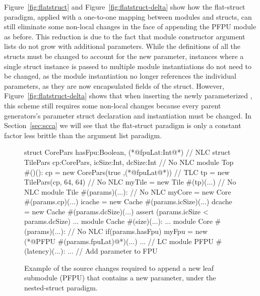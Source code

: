Figure~\ref{fig:flatstruct} and Figure~\ref{fig:flatstruct-delta} show how the flat-struct paradigm,
applied with a one-to-one mapping between modules and structs,
can still eliminate some non-local changes in the face of appending the PFPU module as before.
This reduction is due to the fact that module constructor argument lists do not grow with additional parameters.
While the definitions of all the structs must be changed to account for the new parameter,
instances where a single struct instance is passed to multiple module instantiations do not need to be changed,
as the module instantiation no longer references the individual parameters, as they are now encapsulated fields of the struct.
However, Figure~\ref{fig:flatstruct-delta} shows that when inserting the newly parameterized ,
this scheme still requires some non-local changes because every parent generators's parameter struct declaration and instantiation must be changed.
In Section~\ref{sec:scca} we will see that the flat-struct paradigm is only a constant factor less brittle than the argument list paradigm.

\begin{figure}
\centering
\begin{phdl}
struct CorePars {hasFpu:Boolean, (*@\textcolor[rgb]{1,0,0}{fpuLat:Int}@*)}                     // NLC
struct TilePars {cp:CorePars, icSize:Int, dcSize:Int}            // No NLC
module Top #()():
  cp = new CorePars(true ,(*@\textcolor[rgb]{1,0,0}{fpuLat}@*))                                // TLC
  tp = new TilePars(cp, 64, 64)                                  // No NLC
  myTile = new Tile #(tp)(...)                                   // No NLC
module Tile #(params)(...):                                      // No NLC
  myCore = new Core  #(params.cp)(...)                                                        
  icache = new Cache #(params.icSize)(...)
  dcache = new Cache #(params.dcSize)(...)
  assert (params.icSize < params.dcSize) ...
module Cache #(size)(...): ...
module Core #(params)(...):                                     // No NLC
  if(params.hasFpu) myFpu = new (*@\textcolor[rgb]{1,0,0}{PFPU \#(params.fpuLat)}@*)(...) ...   // LC
module PFPU #(latency)(...): ...     // Add parameter to FPU 
\end{phdl} 
\caption{Example of the source changes required to append a new leaf submodule (PFPU) that contains a new parameter,
under the nested-struct paradigm.}
\label{fig:nestedstruct-append}
\end{figure}

